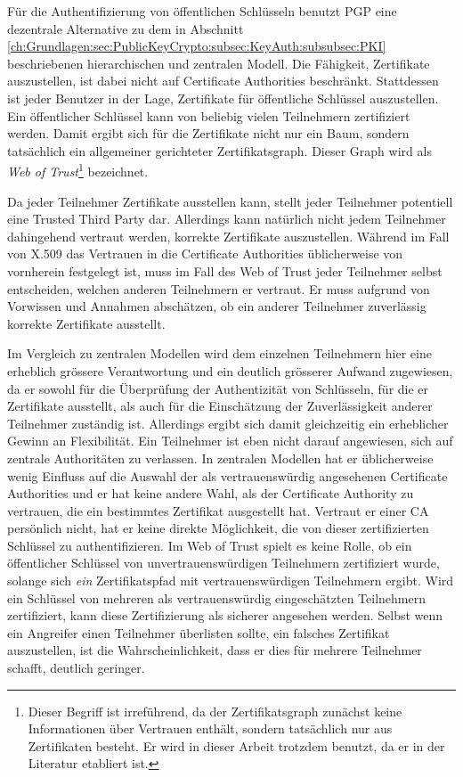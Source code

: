 F\"ur die Authentifizierung von \"offentlichen Schl\"usseln benutzt
PGP eine dezentrale Alternative zu dem in Abschnitt
\ref{ch:Grundlagen:sec:PublicKeyCrypto:subsec:KeyAuth:subsubsec:PKI}
beschriebenen hierarchischen und zentralen
Modell\cite{Ashley1999}. Die F\"ahigkeit, Zertifikate auszustellen,
ist dabei nicht auf Certificate Authorities beschr\"ankt. Stattdessen
ist jeder Benutzer in der Lage, Zertifikate f\"ur \"offentliche
Schl\"ussel auszustellen. Ein \"offentlicher Schl\"ussel kann von
beliebig vielen Teilnehmern zertifiziert werden. Damit ergibt sich
f\"ur die Zertifikate nicht nur ein Baum, sondern tats\"achlich ein
allgemeiner gerichteter Zertifikatsgraph. Dieser Graph wird als
\emph{Web of Trust}\footnote{Dieser Begriff ist irref\"uhrend, da der
  Zertifikatsgraph zun\"achst keine Informationen \"uber Vertrauen
  enth\"alt, sondern tats\"achlich nur aus Zertifikaten besteht. Er
  wird in dieser Arbeit trotzdem benutzt, da er in der Literatur
  etabliert ist.} bezeichnet.

Da jeder Teilnehmer Zertifikate ausstellen kann, stellt jeder
Teilnehmer potentiell eine Trusted Third Party dar. Allerdings kann
nat\"urlich nicht jedem Teilnehmer dahingehend vertraut werden,
korrekte Zertifikate auszustellen. W\"ahrend im Fall von X.509 das
Vertrauen in die Certificate Authorities \"ublicherweise von
vornherein festgelegt ist, muss im Fall des Web of Trust jeder
Teilnehmer selbst entscheiden, welchen anderen Teilnehmern er
vertraut. Er muss aufgrund von Vorwissen und Annahmen absch\"atzen, ob
ein anderer Teilnehmer zuverl\"assig korrekte Zertifikate
ausstellt. 

Im Vergleich zu zentralen Modellen wird dem einzelnen Teilnehmern hier
eine erheblich gr\"ossere Verantwortung und ein deutlich gr\"osserer
Aufwand zugewiesen, da er sowohl f\"ur die \"Uberpr\"ufung der
Authentizit\"at von Schl\"usseln, f\"ur die er Zertifikate ausstellt,
als auch f\"ur die Einsch\"atzung der Zuverl\"assigkeit anderer
Teilnehmer zust\"andig ist. Allerdings ergibt sich damit gleichzeitig
ein erheblicher Gewinn an Flexibilit\"at. Ein Teilnehmer ist eben
nicht darauf angewiesen, sich auf zentrale Authorit\"aten zu
verlassen. In zentralen Modellen hat er \"ublicherweise wenig Einfluss
auf die Auswahl der als vertrauensw\"urdig angesehenen Certificate
Authorities und er hat keine andere Wahl, als der Certificate
Authority zu vertrauen, die ein bestimmtes Zertifikat ausgestellt
hat. Vertraut er einer CA pers\"onlich nicht, hat er keine direkte
M\"oglichkeit, die von dieser zertifizierten Schl\"ussel zu
authentifizieren. Im Web of Trust spielt es keine Rolle, ob ein
\"offentlicher Schl\"ussel von unvertrauensw\"urdigen Teilnehmern
zertifiziert wurde, solange sich \emph{ein} Zertifikatspfad mit
vertrauensw\"urdigen Teilnehmern ergibt. Wird ein Schl\"ussel von
mehreren als vertrauensw\"urdig eingesch\"atzten Teilnehmern
zertifiziert, kann diese Zertifizierung als sicherer angesehen
werden. Selbst wenn ein Angreifer einen Teilnehmer \"uberlisten
sollte, ein falsches Zertifikat auszustellen, ist die
Wahrscheinlichkeit, dass er dies f\"ur mehrere Teilnehmer schafft,
deutlich geringer.

